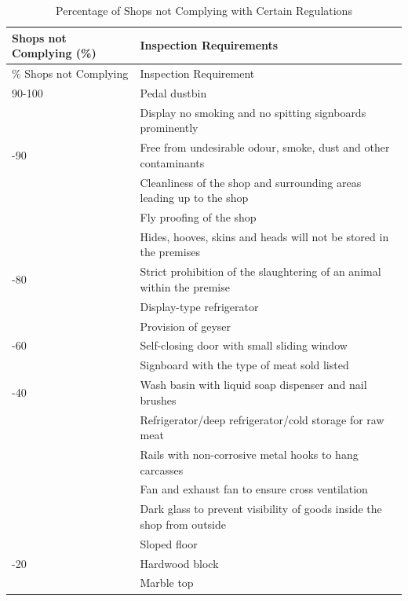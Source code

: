 \documentclass[a4paper, 12pt]{article}
\newcommand\tabitem{\makebox[1em][r]{\textbullet~}}
\begin{document}
\footnotesize
\begin{longtable}{>{\centering}p{2.8cm}>{\raggedright\arraybackslash}p{12cm}}
\caption{Percentage of Shops not Complying with Certain Regulations} \\ 
\toprule
Shops not Complying (\%) & Inspection Requirements \\
\midrule
\endfirsthead
\% Shops not Complying & Inspection Requirement \\
\toprule
\endhead
\endfoot
\hline
\endlastfoot

90-100 & \tabitem Pedal dustbin \\
 & \tabitem Display no smoking and no spitting signboards prominently \\
 \midrule
80-90 & \tabitem Free from undesirable odour, smoke, dust and other contaminants \\
 &  \tabitem Cleanliness of the shop and surrounding areas leading up to the shop \\
 & \tabitem Fly proofing of the shop \\
 & \tabitem Hides, hooves, skins and heads will not be stored in the premises \\
\midrule
60-80 & \tabitem Strict prohibition of the slaughtering of an animal within the premise \\
 & \tabitem Display-type refrigerator \\
 & \tabitem Provision of geyser \\
\midrule
40-60 & \tabitem Self-closing door with small sliding window \\
 & \tabitem Signboard with the type of meat sold listed \\
\midrule
20-40 & \tabitem Wash basin with liquid soap dispenser and nail brushes \\
 & \tabitem Refrigerator/deep refrigerator/cold storage for raw meat \\
 & \tabitem Rails with non-corrosive metal hooks to hang carcasses \\
 & \tabitem Fan and exhaust fan to ensure cross ventilation \\
 & \tabitem Dark glass to prevent visibility of goods inside the shop from outside \\
 & \tabitem Sloped floor \\
\midrule
0-20 & \tabitem Hardwood block \\
 & \tabitem Marble top \\

\end{longtable}
\normalsize
\end{document}

